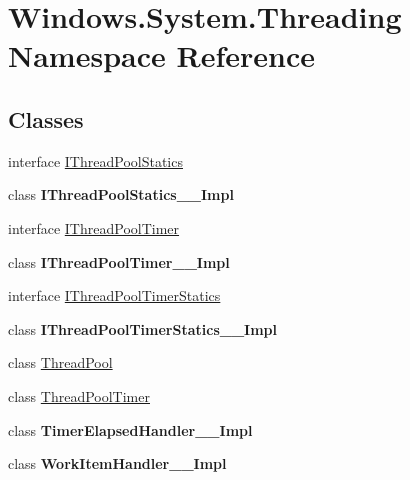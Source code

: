 \hypertarget{namespace_windows_1_1_system_1_1_threading}{}\section{Windows.\+System.\+Threading Namespace Reference}
\label{namespace_windows_1_1_system_1_1_threading}
\subsection*{Classes}
\begin{DoxyCompactItemize}
\item 
interface \hyperlink{interface_windows_1_1_system_1_1_threading_1_1_i_thread_pool_statics}{I\+Thread\+Pool\+Statics}
\item 
class {\bfseries I\+Thread\+Pool\+Statics\+\_\+\+\_\+\+Impl}
\item 
interface \hyperlink{interface_windows_1_1_system_1_1_threading_1_1_i_thread_pool_timer}{I\+Thread\+Pool\+Timer}
\item 
class {\bfseries I\+Thread\+Pool\+Timer\+\_\+\+\_\+\+Impl}
\item 
interface \hyperlink{interface_windows_1_1_system_1_1_threading_1_1_i_thread_pool_timer_statics}{I\+Thread\+Pool\+Timer\+Statics}
\item 
class {\bfseries I\+Thread\+Pool\+Timer\+Statics\+\_\+\+\_\+\+Impl}
\item 
class \hyperlink{class_windows_1_1_system_1_1_threading_1_1_thread_pool}{Thread\+Pool}
\item 
class \hyperlink{class_windows_1_1_system_1_1_threading_1_1_thread_pool_timer}{Thread\+Pool\+Timer}
\item 
class {\bfseries Timer\+Elapsed\+Handler\+\_\+\+\_\+\+Impl}
\item 
class {\bfseries Work\+Item\+Handler\+\_\+\+\_\+\+Impl}
\end{DoxyCompactItemize}
